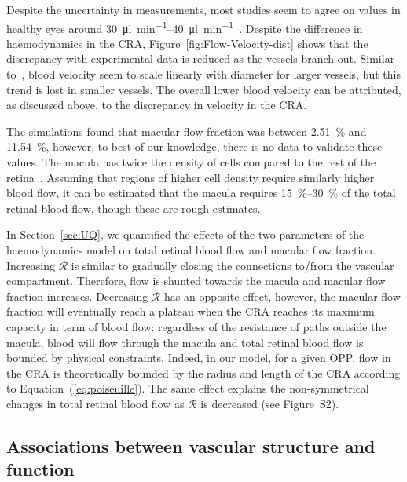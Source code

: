 \documentclass[11pt,]{article}
\begin{document}
Despite the uncertainty in measurements, most studies seem to agree on values in healthy eyes around \SIrange{30}{40}{\micro\litre\per\minute}~\cite{DoblhoffDier2014,Riva1985}.
Despite the difference in haemodynamics in the CRA, Figure~\ref{fig:Flow-Velocity-dist} shows that the discrepancy with experimental data is reduced as the vessels branch out.
Similar to~\cite{DoblhoffDier2014}, blood velocity seem to scale linearly with diameter for larger vessels, but this trend is lost in smaller vessels.
The overall lower blood velocity can be attributed, as discussed above, to the discrepancy in velocity in the CRA.

The simulations found that macular flow fraction was between \SI{2.51}{\percent} and \SI{11.54}{\percent}, however, to best of our knowledge, there is no data to validate these values.
The macula has twice the density of cells compared to the rest of the retina~\cite{Zouache2022}.
Assuming that regions of higher cell density require similarly higher blood flow, it can be estimated that the macula requires \SIrange{15}{30}{\percent} of the total retinal blood flow, though these are rough estimates.

In Section~\ref{sec:UQ}, we quantified the effects of the two parameters of the haemodynamics model on total retinal blood flow and macular flow fraction.
Increasing $\mathcal R$ is similar to gradually closing the connections to/from the vascular compartment.
Therefore, flow is shunted towards the macula and macular flow fraction increases.
Decreasing $\mathcal R$ has an opposite effect, however, the macular flow fraction will eventually reach a plateau when the CRA reaches its maximum capacity in term of blood flow: regardless of the resistance of paths outside the macula, blood will flow through the macula and total retinal blood flow is bounded by physical constraints.
Indeed, in our model, for a given OPP, flow in the CRA is theoretically bounded by the radius and length of the CRA according to Equation~(\ref{eq:poiseuille}).
The same effect explains the non-symmetrical changes in total retinal blood flow as $\mathcal R$ is decreased (see Figure~S2). %

\subsection{Associations between vascular structure and function}\label{sec:disc-results}
\end{document}
